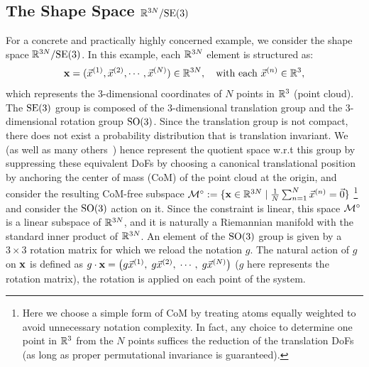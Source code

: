 \subsection{The Shape Space $\mathbb{R}^{3N}/\mathrm{SE}(3)$}\label{appx:r3N-se3-construction}
For a concrete and practically highly concerned example, we consider the shape space $\mathbb{R}^{3N}/\mathrm{SE}(3)$. In this example, each $\mathbb{R}^{3N}$ element is structured as:
\begin{align}
    \mathbf{x} = (\vec{x}^{(1)}, \vec{x}^{(2)}, \cdots, \vec{x}^{(N)}) \in \mathbb{R}^{3N}, \quad \text{with each } \vec{x}^{(n)} \in \mathbb{R}^3,
\end{align}
which represents the 3-dimensional coordinates of $N$ points in $\mathbb{R}^3$ (point cloud).
The $\mathrm{SE}(3)$ group is composed of the 3-dimensional translation group and the 3-dimensional rotation group $\mathrm{SO}(3)$.
Since the translation group is not compact, there does not exist a probability distribution that is translation invariant.
We (as well as many others~\citep{yim2023se,lin2024equivariant}) hence represent the quotient space w.r.t this group by suppressing these equivalent DoFs by choosing a canonical translational position by anchoring the center of mass (CoM) of the point cloud at the origin, and consider the resulting CoM-free subspace $\mathcal{M}^\circ:=\{\mathbf{x}\in\mathbb{R}^{3N} \mid \frac{1}{N}\sum_{n=1}^N \vec{x}^{(n)}=\vec{0}\}$ \footnote{Here we choose a simple form of CoM by treating atoms equally weighted to avoid unnecessary notation complexity. In fact, any choice to determine one point in $\mathbb{R}^3$ from the $N$ points suffices the reduction of the translation DoFs (as long as proper permutational invariance is guaranteed).}
and consider the $\mathrm{SO}(3)$ action on it.
Since the constraint is linear, this space $\mathcal{M}^\circ$ is a linear subspace of $\mathbb{R}^{3N}$, and it is naturally a Riemannian manifold with the standard inner product of $\mathbb{R}^{3N}$. An element of the $\mathrm{SO}(3)$ group is given by a $3 \times 3$ rotation matrix for which we reload the notation $g$. The natural action of $g$ on $\mathbf{x}$ is defined as $g \cdot \mathbf{x} = \bigl( g\vec{x}^{(1)},\; g\vec{x}^{(2)},\; \cdots,\; g \vec{x}^{(N)} \bigr)$ ($g$ here represents the rotation matrix), \ie the rotation is applied on each point of the system.

